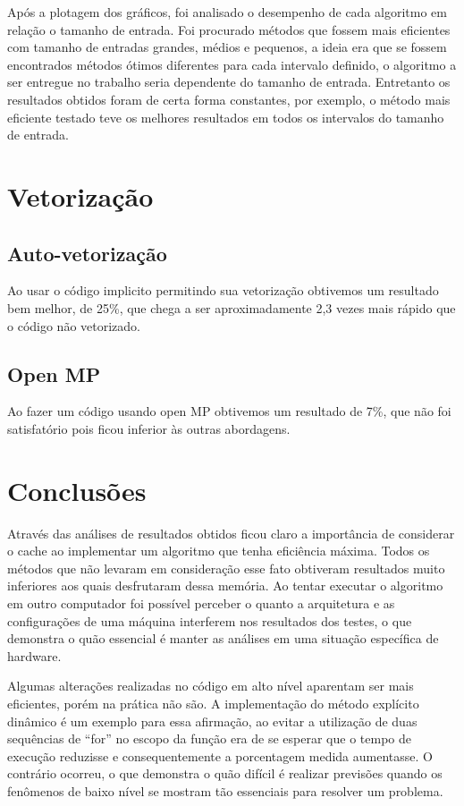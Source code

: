 \documentclass[a4paper, 10pt]{article}
\begin{document}
Após a plotagem dos gráficos, foi analisado o desempenho de cada algoritmo em relação o tamanho de entrada. Foi procurado métodos que fossem mais eficientes com tamanho de entradas grandes, médios e pequenos, a ideia era que se fossem encontrados métodos ótimos diferentes para cada intervalo definido, o algoritmo a ser entregue no trabalho seria dependente do tamanho de entrada. Entretanto os resultados obtidos foram de certa forma constantes, por exemplo, o método mais eficiente testado teve os melhores resultados em todos os intervalos do tamanho de entrada.

\newpage
\section{Vetorização}
\subsection{Auto-vetorização}
Ao usar o código implicito permitindo sua vetorização obtivemos um resultado bem melhor, de 25\%, que chega a ser aproximadamente 2,3 vezes mais rápido que o código não vetorizado.
\subsection{Open MP}
Ao fazer um código usando open MP obtivemos um resultado de 7\%, que não foi satisfatório pois ficou inferior às outras abordagens.

\section{Conclusões}
Através das análises de resultados obtidos ficou claro a importância de considerar o cache ao implementar um algoritmo que tenha eficiência máxima. Todos os métodos que não levaram em consideração esse fato obtiveram resultados muito inferiores aos quais desfrutaram dessa memória. Ao tentar executar o algoritmo em outro computador foi possível perceber o quanto a arquitetura e as configurações de uma máquina interferem nos resultados dos testes, o que demonstra o quão essencial é manter as análises em uma situação específica de hardware.

Algumas alterações realizadas no código em alto nível aparentam ser mais eficientes, porém na prática não são. A implementação do método explícito dinâmico é um exemplo para essa afirmação, ao evitar a utilização de duas sequências de “for” no escopo da função era de se esperar que o tempo de execução reduzisse e consequentemente a porcentagem medida aumentasse. O contrário ocorreu, o que demonstra o quão difícil é realizar previsões quando os fenômenos de baixo nível se mostram tão essenciais para resolver um problema.
\end{document}
